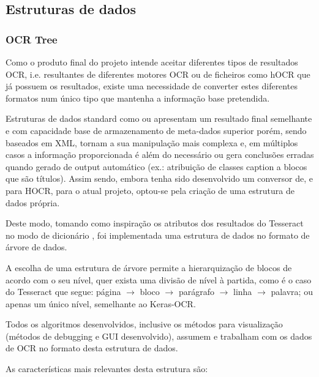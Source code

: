 \subsection{Estruturas de dados}
\label{data_structures}


\subsubsection{OCR Tree}
\label{ocr_tree}

Como o produto final do projeto intende aceitar diferentes tipos de resultados OCR, i.e. resultantes de diferentes motores OCR ou de ficheiros como hOCR que já possuem os resultados, existe uma necessidade de converter estes diferentes formatos num único tipo que mantenha a informação base pretendida.

Estruturas de dados standard como \citep{hocr_doc} ou \citep{alto_doc} apresentam um resultado final semelhante e com capacidade base de armazenamento de meta-dados superior porém, sendo baseados em XML, tornam a sua manipulação mais complexa e, em múltiplos casos a informação proporcionada é além do necessário ou gera conclusões erradas quando gerado de output automático (ex.: atribuição de classes caption a blocos que são títulos). Assim sendo, embora tenha sido desenvolvido um conversor de, e para HOCR, para o atual projeto, optou-se pela criação de uma estrutura de dados própria.

Deste modo, tomando como inspiração os atributos dos resultados do Tesseract no modo de dicionário \citep{tesseract_doc}, foi implementada uma estrutura de dados no formato de árvore de dados.

A escolha de uma estrutura de árvore permite a hierarquização de blocos de acordo com o seu nível, quer exista uma divisão de nível à partida, como é o caso do Tesseract que segue: página $\longrightarrow$ bloco $\longrightarrow$ parágrafo $\longrightarrow$ linha $\longrightarrow$ palavra; ou apenas um único nível, semelhante ao Keras-OCR.

Todos os algoritmos desenvolvidos, inclusive os métodos para visualização (métodos de debugging e GUI desenvolvido), assumem e trabalham com os dados de OCR no formato desta estrutura de dados.

As características mais relevantes desta estrutura são:

